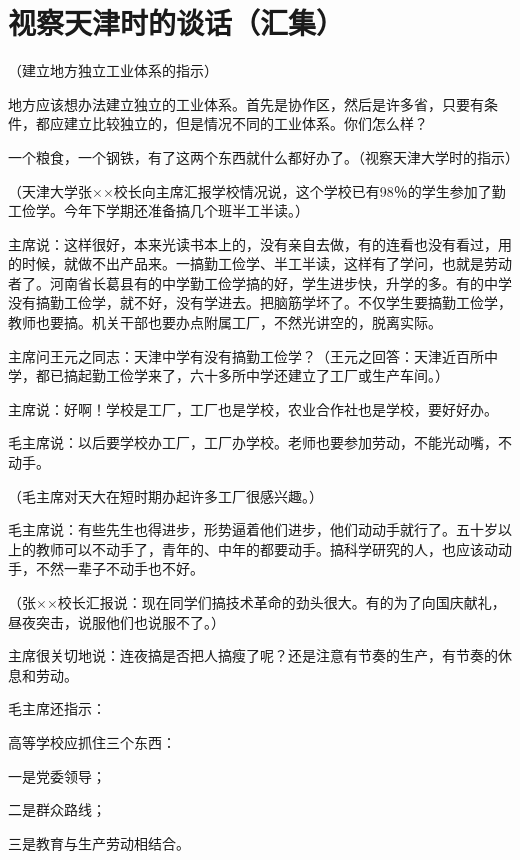 \section[视察天津时的谈话（汇集）（一九五八年八月十三日）]{视察天津时的谈话（汇集）}


（建立地方独立工业体系的指示）

地方应该想办法建立独立的工业体系。首先是协作区，然后是许多省，只要有条件，都应建立比较独立的，但是情况不同的工业体系。你们怎么样？

一个粮食，一个钢铁，有了这两个东西就什么都好办了。（视察天津大学时的指示）

（天津大学张××校长向主席汇报学校情况说，这个学校已有98％的学生参加了勤工俭学。今年下学期还准备搞几个班半工半读。）

主席说：这样很好，本来光读书本上的，没有亲自去做，有的连看也没有看过，用的时候，就做不出产品来。一搞勤工俭学、半工半读，这样有了学问，也就是劳动者了。河南省长葛县有的中学勤工俭学搞的好，学生进步快，升学的多。有的中学没有搞勤工俭学，就不好，没有学进去。把脑筋学坏了。不仅学生要搞勤工俭学，教师也要搞。机关干部也要办点附属工厂，不然光讲空的，脱离实际。

主席问王元之同志：天津中学有没有搞勤工俭学？（王元之回答：天津近百所中学，都已搞起勤工俭学来了，六十多所中学还建立了工厂或生产车间。）

主席说：好啊！学校是工厂，工厂也是学校，农业合作社也是学校，要好好办。

毛主席说：以后要学校办工厂，工厂办学校。老师也要参加劳动，不能光动嘴，不动手。

（毛主席对天大在短时期办起许多工厂很感兴趣。）

毛主席说：有些先生也得进步，形势逼着他们进步，他们动动手就行了。五十岁以上的教师可以不动手了，青年的、中年的都要动手。搞科学研究的人，也应该动动手，不然一辈子不动手也不好。

（张××校长汇报说：现在同学们搞技术革命的劲头很大。有的为了向国庆献礼，昼夜突击，说服他们也说服不了。）

主席很关切地说：连夜搞是否把人搞瘦了呢？还是注意有节奏的生产，有节奏的休息和劳动。

毛主席还指示：

高等学校应抓住三个东西：

一是党委领导；

二是群众路线；

三是教育与生产劳动相结合。



